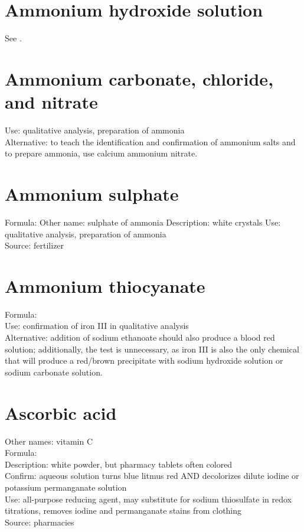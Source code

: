\section{Ammonium hydroxide solution}
\label{sec:}
See .

\section{Ammonium carbonate, chloride, and nitrate}
\label{sec:}
Use: qualitative analysis, 
preparation of ammonia\\
Alternative: to teach the identification 
and confirmation of ammonium salts and to prepare ammonia, 
use calcium ammonium nitrate.

\section{Ammonium sulphate}
\label{sec:}
Formula: 
Other name: sulphate of ammonia
Description: white crystals
Use: qualitative analysis, preparation of ammonia\\
Source: fertilizer

\section{Ammonium thiocyanate}
\label{sec:}
Formula: \\
Use: confirmation of iron III in qualitative analysis\\
Alternative: addition of sodium ethanoate 
should also produce a blood red solution; 
additionally, 
the test is unnecessary, 
as iron III is also the only chemical 
that will produce a red/brown precipitate with sodium hydroxide solution 
or sodium carbonate solution.

\section{Ascorbic acid}
\label{sec:}
Other names: vitamin C\\
Formula: \\
Description: white powder, 
but pharmacy tablets often colored\\
Confirm: aqueous solution turns blue litmus red 
AND decolorizes dilute iodine or potassium permanganate solution\\
Use: all-purpose reducing agent, 
may substitute for sodium thiosulfate in redox titrations, 
removes iodine and permanganate stains from clothing\\
Source: pharmacies

